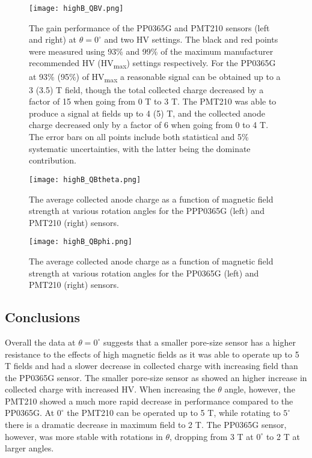 \begin{figure}[!htb]
	\centering
	\texttt{[image: highB\_QBV.png]}
	\caption{The gain performance of the PP0365G and PMT210 sensors (left and right) at $\theta = 0^{\circ}$ and two HV settings. The black and red points were measured using 93\% and 99\% of the maximum manufacturer recommended HV (HV\textsubscript{max}) settings respectively. For the PP0365G at 93\% (95\%) of HV\textsubscript{max} a reasonable signal can be obtained up to a 3 (3.5) T field, though the total collected charge decreased by a factor of 15 when going from 0 T to 3 T. The PMT210 was able to produce a signal at fields up to 4 (5) T, and the collected anode charge decreased only by a factor of 6 when going from 0 to 4 T. The error bars on all points include both statistical and 5\% systematic uncertainties, with the latter being the dominate contribution.}
	\label{fig:highB_nominal_HV}
\end{figure}

\begin{figure}[!htb]
	\centering
	\texttt{[image: highB\_QBtheta.png]}
	\caption{The average collected anode charge as a function of magnetic field strength at various rotation angles for the PPP0365G (left) and PMT210 (right) sensors.}
	\label{fig:highB_QBtheta}
\end{figure}

\begin{figure}[!htb]
	\centering
	\texttt{[image: highB\_QBphi.png]}
	\caption{The average collected anode charge as a function of magnetic field strength at various rotation angles for the PP0365G (left) and PMT210 (right) sensors.}
	\label{fig:highB_QBphi}
\end{figure}

\subsection{Conclusions}
Overall the data at $\theta = 0^{\circ}$ suggests that a smaller pore-size sensor has a higher resistance to the effects of high magnetic fields as it was able to operate up to 5 T fields and had a slower decrease in collected charge with increasing field than the PP0365G sensor. The smaller pore-size sensor as showed an higher increase in collected charge with increased HV. When increasing the $\theta$ angle, however, the PMT210 showed a much more rapid decrease in performance compared to the PP0365G. At $0^{\circ}$ the PMT210 can be operated up to 5 T, while rotating to $5^{\circ}$ there is a dramatic decrease in maximum field to 2 T. The PP0365G sensor, however, was more stable with rotations in $\theta$, dropping from 3 T at $0^{\circ}$ to 2 T at larger angles.

